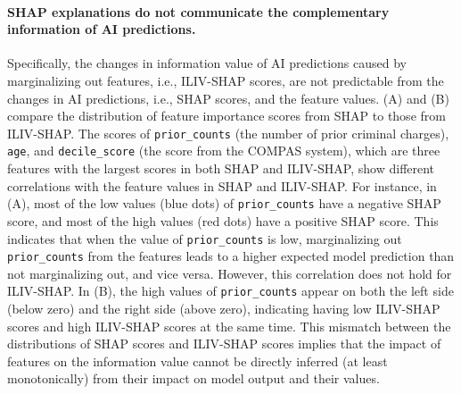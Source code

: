 \paragraph{SHAP explanations do not communicate the complementary information of AI predictions.}
Specifically, the changes in information value of AI predictions caused by marginalizing out features, i.e., ILIV-SHAP scores, are not predictable from the changes in AI predictions, i.e., SHAP scores, and the feature values.
 (A) and (B) compare the distribution of feature importance scores from SHAP to those from ILIV-SHAP.
The scores of \texttt{prior\_counts} (the number of prior criminal charges), \texttt{age}, and \texttt{decile\_score} (the score from the COMPAS system), which are three features with the largest scores in both SHAP and ILIV-SHAP, show different correlations with the feature values in SHAP and ILIV-SHAP.
For instance, in (A), most of the low values (blue dots) of \texttt{prior\_counts} have a negative SHAP score, and most of the high values (red dots) have a positive SHAP score.
This indicates that when the value of \texttt{prior\_counts} is low, marginalizing out \texttt{prior\_counts} from the features leads to a higher expected model prediction than not marginalizing out, and vice versa.
However, this correlation does not hold for ILIV-SHAP.
In (B), the high values of \texttt{prior\_counts} appear on both the left side (below zero) and the right side (above zero), indicating having low ILIV-SHAP scores and high ILIV-SHAP scores at the same time.
This mismatch between the distributions of SHAP scores and ILIV-SHAP scores implies that the impact of features on the information value cannot be directly inferred (at least monotonically) from their impact on model output and their values.


